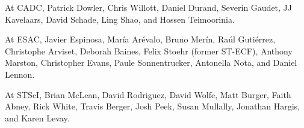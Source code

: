 \documentclass[11pt,twoside]{article}
\begin{document}
At CADC, Patrick Dowler, Chris Willott, Daniel Durand, Severin Gaudet, JJ Kavelaars, David Schade, Ling Shao, and Hossen Teimoorinia.

At ESAC, Javier Espinosa, María Arévalo, Bruno Merín, Raúl Gutiérrez, Christophe Arviset, Deborah Baines, Felix Stoehr (former ST-ECF), Anthony Marston, Christopher Evans, Paule Sonnentrucker, Antonella Nota, and Daniel Lennon.

At STScI, Brian McLean, David Rodriguez, David Wolfe, Matt Burger, Faith Abney, Rick White, Travis Berger, Josh Peek, Susan Mullally, Jonathan Hargis, and Karen Levay.


\end{document}
